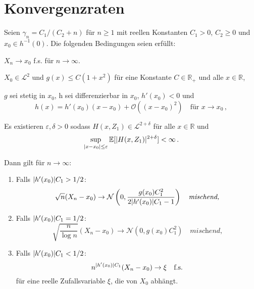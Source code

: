 \documentclass[ngerman,a4paper,11pt]{scrartcl}
\newcommand{\EE}{\mathbb{E}}
\newcommand{\RR}{\mathbb{R}}
\renewcommand{\ll}{\mathcal{L}}
\newcommand{\nn}{\mathcal{N}}
\newcommand{\interv}{\RR}
\newcommand{\expect}[1]{\EE[#1]}
\DeclarePairedDelimiter{\abs}{\lvert}{\rvert}		%
\begin{document}
\section{Konvergenzraten}
\begin{thm}
 \label{thm:haupt}
 Seien $\gamma_n=C_1/(C_2+n)$ für $n\geq 1$ mit reellen Konstanten $C_1>0$,
 $C_2\geq 0$ und $x_0\in h^{-1}(0)$. Die folgenden Bedingungen seien erfüllt:
 \begin{thmasslist}
 \item $X_n\to x_0$ f.s. für $n\to\infty$.
 \item $X_0\in\ll^2$ und $g(x)\leq C(1+x^2)$ für eine Konstante $C\in\RR_+$ und
   alle $x\in \interv$,\label{thm:haupt:b}
 \item $g$ sei stetig in $x_0$, h sei differenzierbar in $x_0$, $h'(x_0)<0$ und\label{thm:haupt:c}
   \begin{equation*}
    h(x) = h'(x_0)(x-x_0) + \mathcal{O}((x-x_0)^2)\quad\text{für $x\to x_0$}\,,
   \end{equation*}
 \item Es existieren $\varepsilon,\delta >0$ sodass $H(x,Z_1)\in\ll^{2+\delta}$ für
   alle $x\in \interv$ und\label{thm:haupt:d} 
   \begin{equation*}
    \sup_{\abs{x-x_0}\leq\varepsilon}\expect{\abs{H(x,Z_1)}^{2+\delta}}<\infty\,.
   \end{equation*}
 \end{thmasslist}
 Dann gilt für $n\to\infty$:
 \begin{enumerate}[label=(\roman*)]
 \item Falls $\abs{h'(x_0)}C_1>1/2$:\label{thm:haupt:i}
   \begin{equation*}
    \sqrt{n}(X_n-x_0)\to\nn\left( 0,\frac{g(x_0)C_1^2}{2\abs{h'(x_0)}C_1-1} \right)\quad\textit{mischend,}
   \end{equation*}
 \item Falls $\abs{h'(x_0)}C_1=1/2$:
   \begin{equation*}
    \sqrt{\frac{n}{\log n}}(X_n-x_0)\to\nn\left( 0,g(x_0)C_1^2 \right)\quad\textit{mischend,}
   \end{equation*}
 \item Falls $\abs{h'(x_0)}C_1<1/2$: 
   \begin{equation*}
     n^{\abs{h'(x_0)}C_1}(X_n-x_0)\to\xi \quad\text{f.s.}
   \end{equation*}
   für eine reelle Zufallsvariable $\xi$, die von $X_0$ abhängt.
 \end{enumerate}
\end{thm}
\end{document}
